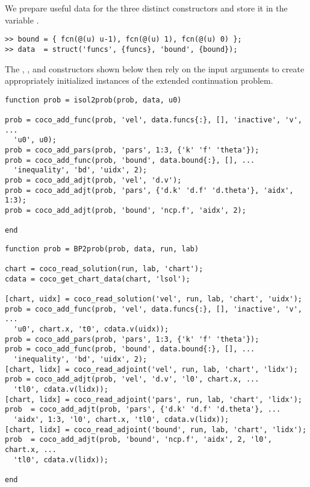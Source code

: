 We prepare useful data for the three distinct constructors and store it in the variable .
\begin{lstlisting}[language=coco-highlight]
>> bound = { fcn(@(u) u-1), fcn(@(u) 1), fcn(@(u) 0) };
>> data  = struct('funcs', {funcs}, 'bound', {bound});
\end{lstlisting}
The , , and  constructors shown below then rely on the input arguments to create appropriately initialized instances of the extended continuation problem.
\begin{lstlisting}[language=coco-highlight]
function prob = isol2prob(prob, data, u0)

prob = coco_add_func(prob, 'vel', data.funcs{:}, [], 'inactive', 'v', ...
  'u0', u0);
prob = coco_add_pars(prob, 'pars', 1:3, {'k' 'f' 'theta'});
prob = coco_add_func(prob, 'bound', data.bound{:}, [], ...
  'inequality', 'bd', 'uidx', 2);
prob = coco_add_adjt(prob, 'vel', 'd.v');
prob = coco_add_adjt(prob, 'pars', {'d.k' 'd.f' 'd.theta'}, 'aidx', 1:3);
prob = coco_add_adjt(prob, 'bound', 'ncp.f', 'aidx', 2);

end
\end{lstlisting}
\begin{lstlisting}[language=coco-highlight]
function prob = BP2prob(prob, data, run, lab)

chart = coco_read_solution(run, lab, 'chart');
cdata = coco_get_chart_data(chart, 'lsol');

[chart, uidx] = coco_read_solution('vel', run, lab, 'chart', 'uidx');
prob = coco_add_func(prob, 'vel', data.funcs{:}, [], 'inactive', 'v', ...
  'u0', chart.x, 't0', cdata.v(uidx));
prob = coco_add_pars(prob, 'pars', 1:3, {'k' 'f' 'theta'});
prob = coco_add_func(prob, 'bound', data.bound{:}, [], ...
  'inequality', 'bd', 'uidx', 2);
[chart, lidx] = coco_read_adjoint('vel', run, lab, 'chart', 'lidx');
prob = coco_add_adjt(prob, 'vel', 'd.v', 'l0', chart.x, ...
  'tl0', cdata.v(lidx));
[chart, lidx] = coco_read_adjoint('pars', run, lab, 'chart', 'lidx');
prob  = coco_add_adjt(prob, 'pars', {'d.k' 'd.f' 'd.theta'}, ...
  'aidx', 1:3, 'l0', chart.x, 'tl0', cdata.v(lidx));
[chart, lidx] = coco_read_adjoint('bound', run, lab, 'chart', 'lidx');
prob  = coco_add_adjt(prob, 'bound', 'ncp.f', 'aidx', 2, 'l0', chart.x, ...
  'tl0', cdata.v(lidx));

end
\end{lstlisting}
